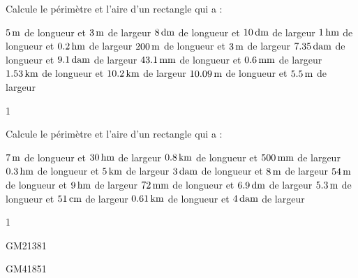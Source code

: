 \documentclass[a4paper,11pt]{report}
\begin{document}
\begin{exo}{
Calcule le périmètre et l'aire d'un rectangle qui a :

\begin{tasks}[after-item-skip = 0.3em]

	\task $\tunit{5}{m}$ de longueur et $\tunit{3}{m}$ de largeur
	\task $\tunit{8}{dm}$ de longueur et $\tunit{10}{dm}$ de largeur
	\task $\tunit{1}{hm}$ de longueur et $\tunit{0,2}{hm}$ de largeur
	\task $\tunit{200}{m}$ de longueur et $\tunit{3}{m}$ de largeur
	\task $\tunit{7,35}{dam}$ de longueur et $\tunit{9,1}{dam}$ de largeur
	\task $\tunit{43,1}{mm}$ de longueur et $\tunit{0,6}{mm}$ de largeur
	\task $\tunit{1,53}{km}$ de longueur et $\tunit{10,2}{km}$ de largeur
	\task $\tunit{10,09}{m}$ de longueur et $\tunit{5,5}{m}$ de largeur
\end{tasks}
}{1}
\end{exo}


\begin{exo}{
Calcule le périmètre et l'aire d'un rectangle qui a :

\begin{tasks}[after-item-skip = 0.3em]

	\task $\tunit{7}{m}$ de longueur et $\tunit{30}{hm}$ de largeur
	\task $\tunit{0,8}{km}$ de longueur et $\tunit{500}{mm}$ de largeur
	\task $\tunit{0,3}{hm}$ de longueur et $\tunit{5}{km}$ de largeur
	\task $\tunit{3}{dam}$ de longueur et $\tunit{8}{m}$ de largeur
	\task $\tunit{54}{m}$ de longueur et $\tunit{9}{hm}$ de largeur
	\task $\tunit{72}{mm}$ de longueur et $\tunit{6,9}{dm}$ de largeur
	\task $\tunit{5,3}{m}$ de longueur et $\tunit{51}{cm}$ de largeur
	\task $\tunit{0,61}{km}$ de longueur et $\tunit{4}{dam}$ de largeur
\end{tasks}
}{1}
\end{exo}

 
\begin{exol}{GM2}{138}{1}       %
\end{exol}
\begin{exof}{GM4}{185}{1}       %
\end{exof}
\end{document}
